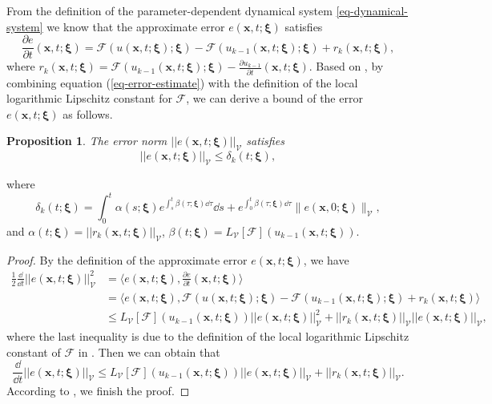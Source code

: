 \documentclass[10pt,a4paper]{article}
\newtheorem{proposition}{Proposition}
\numberwithin{equation}{section}
\numberwithin{lemma}{section}
\numberwithin{example}{section}
\numberwithin{definition}{section}
\numberwithin{assumption}{section}
\numberwithin{theorem}{section}
\numberwithin{proposition}{section}
\numberwithin{corollary}{section}
\numberwithin{remark}{section}
\begin{document}
From the definition of the parameter-dependent dynamical system \eqref{eq-dynamical-system} we know that the approximate error $e(\bm{x},t;\bm{\xi})$ satisfies
\begin{equation}
\label{eq-error-estimate}
\frac{\partial e}{\partial t}(\bm{x},t;\bm{\xi}) =\mathcal{F}(u(\bm{x},t;\bm{\xi});\bm{\xi})-\mathcal{F}(u_{k-1}(\bm{x},t;\bm{\xi});\bm{\xi})+r_k(\bm{x},t;\bm{\xi}),
\end{equation}
where $r_k(\bm{x},t;\bm{\xi})=\mathcal{F}(u_{k-1}(\bm{x},t;\bm{\xi});\bm{\xi})-\frac{\partial u_{k-1}}{\partial t}(\bm{x},t;\bm{\xi})$.
Based on , by combining equation (\ref{eq-error-estimate}) with the definition of the local logarithmic Lipschitz constant for $\mathcal{F}$, we can derive a bound of the error ${e}(\bm{x},t;\bm{\xi})$ as follows.
\begin{proposition}
\label{prop-e}
The error norm $||{e}(\bm{x},t;\bm{\xi}) ||_{\mathcal{V}}$ satisfies 
$$
||{e}(\bm{x},t;\bm{\xi})||_{\mathcal{V}}\leq\delta_k(t;\bm{\xi}),
$$
\end{proposition}
where 
\begin{equation}
\label{errordelta}
\delta_k(t;\bm{\xi})=\int_{0}^t\alpha(s;\bm{\xi})e^{\int_{s}^{t}\beta(\tau;\bm{\xi})\dd\tau}\dd s+e^{\int_{0}^{t}\beta(\tau;\bm{\xi})\dd\tau}\|e(\bm{x},0;\bm{\xi})\|_{\mathcal{V}},
\end{equation}
and $\alpha(t;\bm{\xi})=||{r}_k(\bm{x},t;\bm{\xi})||_{\mathcal{V}}$, $\beta(t;\bm{\xi})=L_{\mathcal{V}}[\mathcal{F}]({u}_{k-1}(\bm{x},t;\bm{\xi}))$.


\begin{proof}
By the definition of the approximate error ${e}(\bm{x},t;\bm{\xi})$, we have
$$
\begin{aligned}
  \frac{1}{2}\frac{\dd}{\dd t}||{e}(\bm{x},t;\bm{\xi})||_{\mathcal{V}}^2&=\langle {e}(\bm{x},t;\bm{\xi}),\frac{\partial e}{\partial t}(\bm{x},t;\bm{\xi}) \rangle \\
  &=\langle {e}(\bm{x},t;\bm{\xi}), \mathcal{F}({u}(\bm{x},t;\bm{\xi});\bm{\xi})-\mathcal{F}({u}_{k-1}(\bm{x},t;\bm{\xi});\bm{\xi})+{r}_k(\bm{x},t;\bm{\xi})\rangle\\
  &\leq L_\mathcal{V}[\mathcal{F}]({u}_{k-1}(\bm{x},t;\bm{\xi}))||{e}(\bm{x},t;\bm{\xi})||_{\mathcal{V}}^2+||{r}_k(\bm{x},t;\bm{\xi})||_{\mathcal{V}}||{e}(\bm{x},t;\bm{\xi})||_{\mathcal{V}},
\end{aligned}
$$
where the last inequality is due to the definition of the local logarithmic Lipschitz constant of $\mathcal{F}$ in . Then we can obtain that
$$
    \frac{\dd}{\dd t}||{e}(\bm{x},t;\bm{\xi})||_{\mathcal{V}}\leq L_\mathcal{V}[\mathcal{F}]({u}_{k-1}(\bm{x},t;\bm{\xi}))||{e}(\bm{x},t;\bm{\xi})||_{\mathcal{V}}+||{r}_k(\bm{x},t;\bm{\xi})||_{\mathcal{V}}.
$$
According to , we finish the proof.  
\end{proof}
\end{document}
